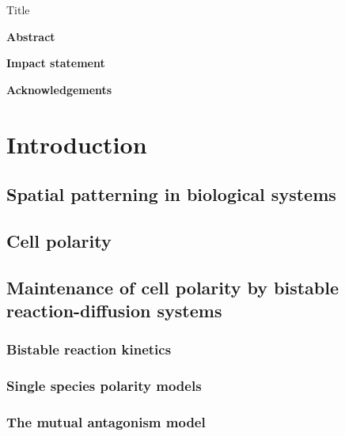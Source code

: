 \documentclass[11pt]{"article"}
\begin{document}
\begin{titlepage}
\centering
{\huge Title\\}
\end{titlepage}


\pagebreak

\begin{Large}
\textbf{Abstract}\\
\end{Large}


\pagebreak

\begin{Large}
\textbf{Impact statement}\\
\end{Large}


\pagebreak

\begin{Large}
\textbf{Acknowledgements}\\
\end{Large}


\tableofcontents
\listoffigures


\clearpage
\section{Introduction}

\subsection{Spatial patterning in biological systems}

\clearpage
\subsection{Cell polarity}

\clearpage
\subsection{Maintenance of cell polarity by bistable reaction-diffusion systems}
\subsubsection{Bistable reaction kinetics}
\subsubsection{Single species polarity models}
\subsubsection{The mutual antagonism model}
\end{document}
